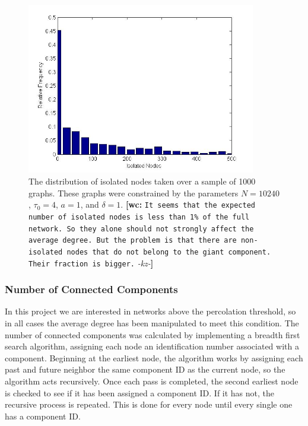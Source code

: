 \documentclass[preprint,notitlepage,amsmath,amssymb,floatfix]{revtex4-1}
\newcommand{\XXX}[3]{{\bf [#1: } {\tt #3} {\it -#2-}{\bf ]}}
\begin{document}
\begin{figure}
\includegraphics[width=10cm]{figures/Isolated_Nodes.jpg}
\caption{The distribution of isolated nodes taken over a sample of 1000 graphs.  These graphs were constrained by the parameters $N = 10240$, $\tau_0 = 4$, $a = 1$, and $\delta = 1$. \XXX{wc}{kz}{It seems that the expected number of isolated nodes is less than 1\% of the full network. So they alone should not strongly affect the average degree. But the problem is that there are non-isolated nodes that do not belong to the giant component. Their fraction is bigger.}}
\label{fig:iso_nodes_uni}
\centering
\end{figure}

\subsubsection{Number of Connected Components}
In this project we are interested in networks above the percolation threshold, so in all cases the average degree has been manipulated to meet this condition.  
The number of connected components was calculated by implementing a breadth first search algorithm, assigning each node an identification number associated with a component.
Beginning at the earliest node, the algorithm works by assigning each past and future neighbor the same component ID as the current node, so the algorithm acts recursively.  Once each pass is completed, the second earliest node is checked to see if it has been assigned a component ID.  If it has not, the recursive process is repeated.  This is done for every node until every single one has a component ID.

\end{document}
